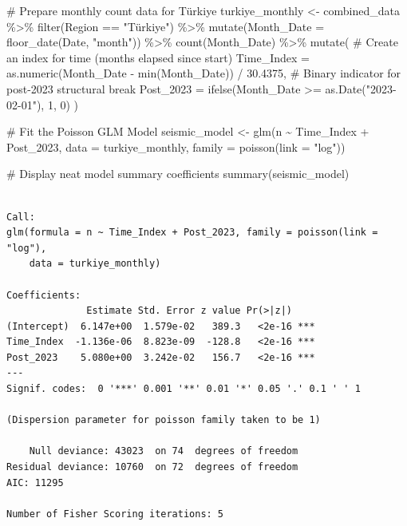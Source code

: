 \documentclass[
  11pt,
  a4paper,
  DIV=11,
  numbers=noendperiod]{scrartcl}
\newenvironment{Shaded}{\begin{snugshade}}{\end{snugshade}}
\newcommand{\AttributeTok}[1]{\textcolor[rgb]{0.40,0.45,0.13}{#1}}
\newcommand{\CommentTok}[1]{\textcolor[rgb]{0.37,0.37,0.37}{#1}}
\newcommand{\DecValTok}[1]{\textcolor[rgb]{0.68,0.00,0.00}{#1}}
\newcommand{\FloatTok}[1]{\textcolor[rgb]{0.68,0.00,0.00}{#1}}
\newcommand{\FunctionTok}[1]{\textcolor[rgb]{0.28,0.35,0.67}{#1}}
\newcommand{\NormalTok}[1]{\textcolor[rgb]{0.00,0.23,0.31}{#1}}
\newcommand{\OtherTok}[1]{\textcolor[rgb]{0.00,0.23,0.31}{#1}}
\newcommand{\SpecialCharTok}[1]{\textcolor[rgb]{0.37,0.37,0.37}{#1}}
\newcommand{\StringTok}[1]{\textcolor[rgb]{0.13,0.47,0.30}{#1}}
\begin{document}
\begin{Shaded}
\begin{Highlighting}[]
\CommentTok{\# Prepare monthly count data for Türkiye}
\NormalTok{turkiye\_monthly }\OtherTok{\textless{}{-}}\NormalTok{ combined\_data }\SpecialCharTok{\%\textgreater{}\%}
  \FunctionTok{filter}\NormalTok{(Region }\SpecialCharTok{==} \StringTok{"Türkiye"}\NormalTok{) }\SpecialCharTok{\%\textgreater{}\%}
  \FunctionTok{mutate}\NormalTok{(}\AttributeTok{Month\_Date =} \FunctionTok{floor\_date}\NormalTok{(Date, }\StringTok{"month"}\NormalTok{)) }\SpecialCharTok{\%\textgreater{}\%}
  \FunctionTok{count}\NormalTok{(Month\_Date) }\SpecialCharTok{\%\textgreater{}\%}
  \FunctionTok{mutate}\NormalTok{(}
    \CommentTok{\# Create an index for time (months elapsed since start)}
    \AttributeTok{Time\_Index =} \FunctionTok{as.numeric}\NormalTok{(Month\_Date }\SpecialCharTok{{-}} \FunctionTok{min}\NormalTok{(Month\_Date)) }\SpecialCharTok{/} \FloatTok{30.4375}\NormalTok{,}
    \CommentTok{\# Binary indicator for post{-}2023 structural break}
    \AttributeTok{Post\_2023 =} \FunctionTok{ifelse}\NormalTok{(Month\_Date }\SpecialCharTok{\textgreater{}=} \FunctionTok{as.Date}\NormalTok{(}\StringTok{"2023{-}02{-}01"}\NormalTok{), }\DecValTok{1}\NormalTok{, }\DecValTok{0}\NormalTok{)}
\NormalTok{  )}

\CommentTok{\# Fit the Poisson GLM Model}
\NormalTok{seismic\_model }\OtherTok{\textless{}{-}} \FunctionTok{glm}\NormalTok{(n }\SpecialCharTok{\textasciitilde{}}\NormalTok{ Time\_Index }\SpecialCharTok{+}\NormalTok{ Post\_2023, }\AttributeTok{data =}\NormalTok{ turkiye\_monthly, }\AttributeTok{family =} \FunctionTok{poisson}\NormalTok{(}\AttributeTok{link =} \StringTok{"log"}\NormalTok{))}

\CommentTok{\# Display neat model summary coefficients}
\FunctionTok{summary}\NormalTok{(seismic\_model)}
\end{Highlighting}
\end{Shaded}

\begin{verbatim}

Call:
glm(formula = n ~ Time_Index + Post_2023, family = poisson(link = "log"), 
    data = turkiye_monthly)

Coefficients:
              Estimate Std. Error z value Pr(>|z|)    
(Intercept)  6.147e+00  1.579e-02   389.3   <2e-16 ***
Time_Index  -1.136e-06  8.823e-09  -128.8   <2e-16 ***
Post_2023    5.080e+00  3.242e-02   156.7   <2e-16 ***
---
Signif. codes:  0 '***' 0.001 '**' 0.01 '*' 0.05 '.' 0.1 ' ' 1

(Dispersion parameter for poisson family taken to be 1)

    Null deviance: 43023  on 74  degrees of freedom
Residual deviance: 10760  on 72  degrees of freedom
AIC: 11295

Number of Fisher Scoring iterations: 5
\end{verbatim}
\end{document}
